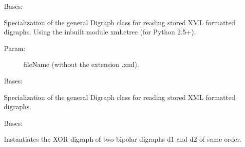 \documentclass[letterpaper,10pt,english]{sphinxmanual}
\begin{document}
\begin{fulllineitems}
\label{techDoc:digraphs.XMLDigraph}
Bases: {\hyperref[techDoc:digraphs.Digraph]{}}

Specialization of the general Digraph class for reading
stored XML formatted digraphs. Using the inbuilt module
xml.etree (for Python 2.5+).
\begin{description}
\item[{Param:}] \leavevmode
fileName (without the extension .xml).

\end{description}

\end{fulllineitems}


\begin{fulllineitems}
\label{techDoc:digraphs.XMLDigraph24}
Bases: {\hyperref[techDoc:digraphs.Digraph]{}}

Specialization of the general Digraph class for reading
stored XML formatted digraphs.

\begin{fulllineitems}
\label{techDoc:digraphs.XMLDigraph24.showAll}
\end{fulllineitems}


\end{fulllineitems}


\begin{fulllineitems}
\label{techDoc:digraphs.XORDigraph}
Bases: {\hyperref[techDoc:digraphs.Digraph]{}}

Instantiates the XOR digraph of two bipolar
digraphs d1 and d2 of same order.

\end{fulllineitems}


\begin{fulllineitems}
\label{techDoc:digraphs.all_perms}
\end{fulllineitems}
\end{document}
